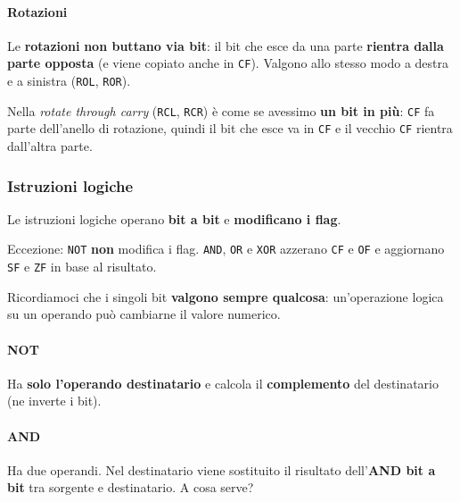 \documentclass[11pt,a4paper]{article}
\begin{document}
\paragraph*{Rotazioni}

Le \textbf{rotazioni} \textbf{non buttano via bit}: il bit che esce da una parte \textbf{rientra dalla parte opposta} (e viene copiato anche in \texttt{CF}). Valgono allo stesso modo a destra e a sinistra (\texttt{ROL}, \texttt{ROR}).

Nella \emph{rotate through carry} (\texttt{RCL}, \texttt{RCR}) è come se avessimo \textbf{un bit in più}: \texttt{CF} fa parte dell'anello di rotazione, quindi il bit che esce va in \texttt{CF} e il vecchio \texttt{CF} rientra dall'altra parte.

\subsubsection*{Istruzioni logiche}

Le istruzioni logiche operano \textbf{bit a bit} e \textbf{modificano i flag}.

\begin{integrazione}
Eccezione: \texttt{NOT} \textbf{non} modifica i flag. \texttt{AND}, \texttt{OR} e \texttt{XOR} azzerano \texttt{CF} e \texttt{OF} e aggiornano \texttt{SF} e \texttt{ZF} in base al risultato.
\end{integrazione}

\begin{nota}[Attenzione]
Ricordiamoci che i singoli bit \textbf{valgono sempre qualcosa}: un'operazione logica su un operando può cambiarne il valore numerico.
\end{nota}

\paragraph*{NOT}

Ha \textbf{solo l'operando destinatario} e calcola il \textbf{complemento} del destinatario (ne inverte i bit).

\paragraph*{AND}

Ha due operandi. Nel destinatario viene sostituito il risultato dell'\textbf{AND bit a bit} tra sorgente e destinatario. A cosa serve?
\end{document}
